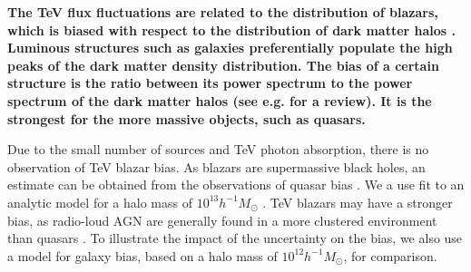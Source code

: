 \documentclass[twocolumns]{emulateapj}
\newcommand\ALc[1]{{\color{red} \bf #1}} %
\begin{document}
\ALc{The TeV flux fluctuations are related to the distribution of blazars, which is biased with respect to the distribution of dark matter halos \citep{1996MNRAS.282..347M}. Luminous structures such as galaxies preferentially populate the high peaks of the dark matter density distribution.  The bias of a certain structure is the ratio between its power spectrum to the power spectrum of the dark matter halos (see e.g. \citet{2002PhR...372....1C} for a review). It is the strongest for the more massive objects, such as quasars. 

Due to the small number of sources and TeV photon absorption, there is no observation of  TeV blazar bias.  As blazars are supermassive black holes, an estimate can be obtained from the observations of quasar bias \citep{2005MNRAS.356..415C,2007ApJ...658...85M,2007AJ....133.2222S}. We a use fit to an analytic model for a halo mass of $10^{13}h^{-1}M_{\odot}$ \citet{2008ApJ...678..627B}.  TeV blazars may have a stronger bias, as radio-loud AGN are generally found in a more clustered environment than quasars \citep{2009MNRAS.393..377M,2012MNRAS.421.3060S}. To illustrate the impact of the uncertainty on the bias, we also use a model for galaxy bias, based on a  halo mass of $10^{12}h^{-1} M_{\odot}$,  for comparison. }



\end{document}
